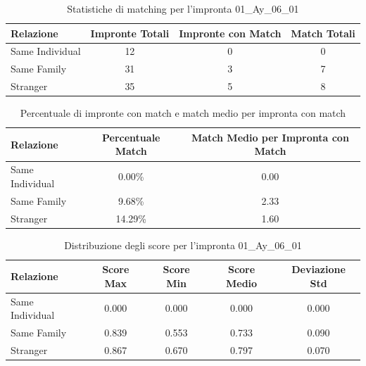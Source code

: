 \begin{table}[htbp]
\centering
\caption{Statistiche di matching per l'impronta 01\_Ay\_06\_01}
\label{tab:results_01_Ay_06_01}
\begin{tabular}{|l|c|c|c|}
\hline
\textbf{Relazione} & \textbf{Impronte Totali} & \textbf{Impronte con Match} & \textbf{Match Totali} \\
\hline
Same Individual & 12 & 0 & 0 \\
\hline
Same Family & 31 & 3 & 7 \\
\hline
Stranger & 35 & 5 & 8 \\
\hline
\end{tabular}
\end{table}


\begin{table}[htbp]
\centering
\caption{Percentuale di impronte con match e match medio per impronta con match}
\label{tab:match_percentage_01_Ay_06_01}
\begin{tabular}{|l|c|c|}
\hline
\textbf{Relazione} & \textbf{Percentuale Match} & \textbf{Match Medio per Impronta con Match} \\
\hline
Same Individual & 0.00\% & 0.00 \\
\hline
Same Family & 9.68\% & 2.33 \\
\hline
Stranger & 14.29\% & 1.60 \\
\hline
\end{tabular}
\end{table}


\begin{table}[htbp]
\centering
\caption{Distribuzione degli score per l'impronta 01\_Ay\_06\_01}
\label{tab:scores_01_Ay_06_01}
\begin{tabular}{|l|c|c|c|c|}
\hline
\textbf{Relazione} & \textbf{Score Max} & \textbf{Score Min} & \textbf{Score Medio} & \textbf{Deviazione Std} \\
\hline
Same Individual & 0.000 & 0.000 & 0.000 & 0.000 \\
\hline
Same Family & 0.839 & 0.553 & 0.733 & 0.090 \\
\hline
Stranger & 0.867 & 0.670 & 0.797 & 0.070 \\
\hline
\end{tabular}
\end{table}

